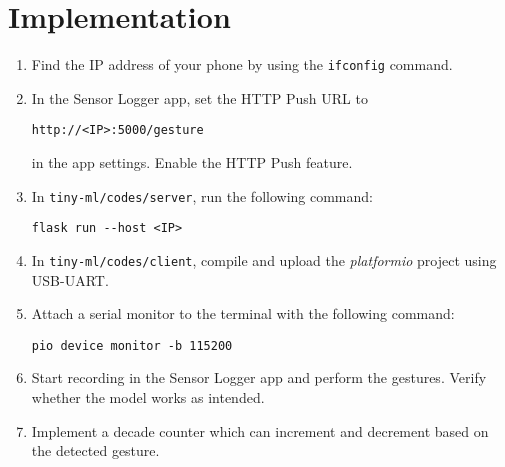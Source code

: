 \section{Implementation}
\begin{enumerate}
    \item Find the IP address of your phone by using the \texttt{ifconfig}
    command.
    \item In the Sensor Logger app, set the HTTP Push URL to
    \begin{lstlisting}
http://<IP>:5000/gesture
    \end{lstlisting}
    in the app settings. Enable the HTTP Push feature.
    \item In \texttt{tiny-ml/codes/server}, run the following command:
    \begin{lstlisting}
flask run --host <IP>
    \end{lstlisting}
    \item In \texttt{tiny-ml/codes/client}, compile and upload the 
    \textit{platformio} project using USB-UART.
    \item Attach a serial monitor to the terminal with the following command:
    \begin{lstlisting}
pio device monitor -b 115200
    \end{lstlisting}
    \item Start recording in the Sensor Logger app and perform the gestures.
    Verify whether the model works as intended.
    \item Implement a decade counter which can increment and decrement based 
    on the detected gesture.
\end{enumerate}
